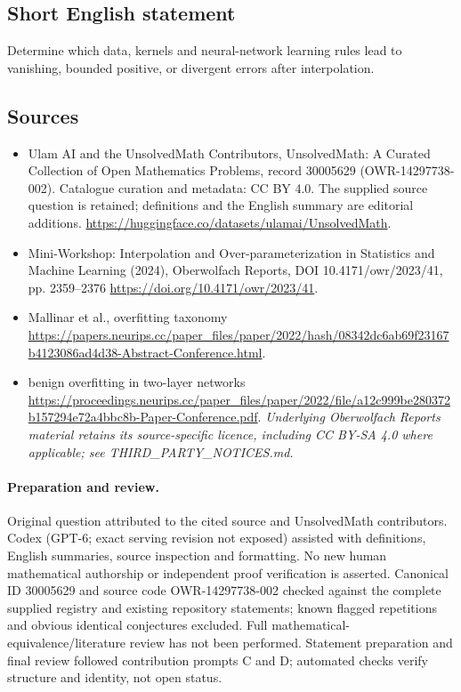 \documentclass[11pt]{article}
\begin{document}
\subsection{Short English statement}
Determine which data, kernels and neural-network learning rules lead to vanishing, bounded positive, or divergent errors after interpolation.
\subsection{Sources}
\begin{itemize}
\item[\hypertarget{source:30005629:1}{S1}] Ulam AI and the UnsolvedMath Contributors, UnsolvedMath: A Curated Collection of Open Mathematics Problems, record 30005629 (OWR-14297738-002). Catalogue curation and metadata: CC BY 4.0. The supplied source question is retained; definitions and the English summary are editorial additions.
\url{https://huggingface.co/datasets/ulamai/UnsolvedMath}.
\item[\hypertarget{source:30005629:2}{S2}] Mini-Workshop: Interpolation and Over-parameterization in Statistics and Machine Learning​ (2024), Oberwolfach Reports, DOI 10.4171/owr/2023/41, pp. 2359--2376
\url{https://doi.org/10.4171/owr/2023/41}.
\item[\hypertarget{source:30005629:3}{S3}] Mallinar et al., overfitting taxonomy
\url{https://papers.neurips.cc/paper_files/paper/2022/hash/08342dc6ab69f23167b4123086ad4d38-Abstract-Conference.html}.
\item[\hypertarget{source:30005629:4}{S4}] benign overfitting in two-layer networks
\url{https://proceedings.neurips.cc/paper_files/paper/2022/file/a12c999be280372b157294e72a4bbc8b-Paper-Conference.pdf}.
\textit{Underlying Oberwolfach Reports material retains its source-specific licence, including CC BY-SA 4.0 where applicable; see THIRD\_PARTY\_NOTICES.md.}
\end{itemize}
\paragraph{Preparation and review.}
Original question attributed to the cited source and UnsolvedMath contributors. Codex (GPT-6; exact serving revision not exposed) assisted with definitions, English summaries, source inspection and formatting. No new human mathematical authorship or independent proof verification is asserted. Canonical ID 30005629 and source code OWR-14297738-002 checked against the complete supplied registry and existing repository statements; known flagged repetitions and obvious identical conjectures excluded. Full mathematical-equivalence/literature review has not been performed. Statement preparation and final review followed contribution prompts C and D; automated checks verify structure and identity, not open status.
\label{end:30005629}
\end{document}
